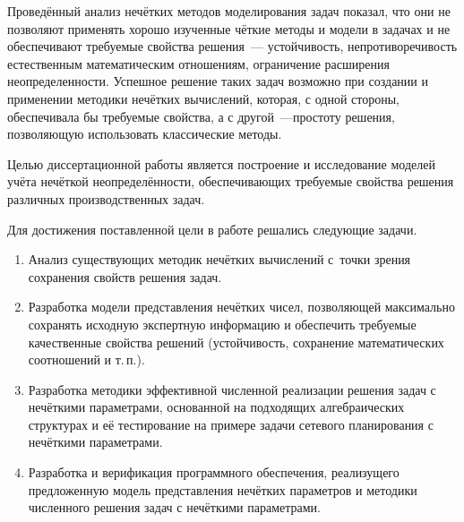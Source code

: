 Проведённый анализ нечётких методов моделирования задач показал, что они не позволяют применять хорошо изученные чёткие методы и модели в задачах и не обеспечивают требуемые свойства решения~--- устойчивость, непротиворечивость естественным математическим отношениям, ограничение расширения неопределенности. Успешное решение таких задач возможно при создании и применении методики нечётких вычислений, которая, с одной стороны, обеспечивала бы требуемые свойства, а с другой~---простоту решения, позволяющую использовать классические методы.



Целью диссертационной работы является построение и исследование моделей учёта нечёткой неопределённости, обеспечивающих требуемые свойства решения различных производственных задач.

Для достижения поставленной цели в работе решались следующие задачи.
\begin{enumerate}
  \item Анализ существующих методик нечётких вычислений с~точки зрения сохранения свойств решения задач.
  \item Разработка модели представления нечётких чисел, позволяющей максимально сохранять исходную экспертную информацию и обеспечить требуемые качественные свойства решений (устойчивость, сохранение математических соотношений и т.\,п.).
  \item Разработка методики эффективной численной реализации решения задач с нечёткими параметрами, основанной на подходящих алгебраических структурах и её тестирование на примере задачи сетевого планирования с нечёткими параметрами.
  \item Разработка и верификация программного обеспечения, реализущего предложенную модель представления нечётких параметров и методики численного решения задач с нечёткими параметрами.
\end{enumerate}